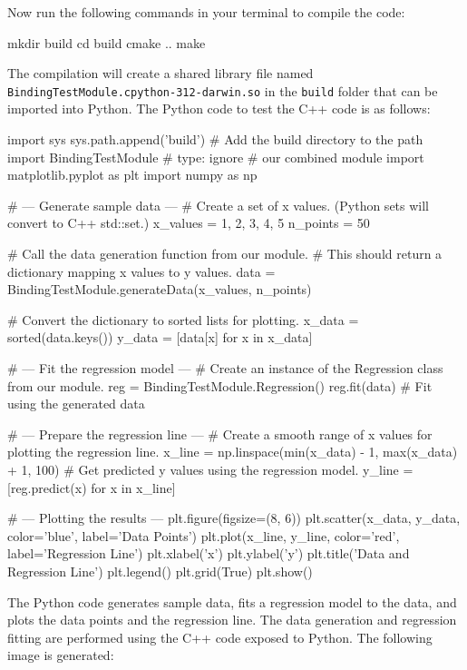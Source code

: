 Now run the following commands in your terminal to compile the code:

\begin{codeblock}[language=bash]
mkdir build
cd build
cmake ..
make
\end{codeblock}

The compilation will create a shared library file named \texttt{BindingTestModule.cpython-312-darwin.so} in the \texttt{build} folder that can be imported into Python. 
The Python code to test the C++ code is as follows:

\begin{exampleblock}[regression.py]
\begin{codeblock}[language=python]
import sys 
sys.path.append('build')  # Add the build directory to the path
import BindingTestModule  # type: ignore # our combined module
import matplotlib.pyplot as plt
import numpy as np

# --- Generate sample data ---
# Create a set of x values. (Python sets will convert to C++ std::set.)
x_values = {1, 2, 3, 4, 5}
n_points = 50

# Call the data generation function from our module.
# This should return a dictionary mapping x values to y values.
data = BindingTestModule.generateData(x_values, n_points)

# Convert the dictionary to sorted lists for plotting.
x_data = sorted(data.keys())
y_data = [data[x] for x in x_data]

# --- Fit the regression model ---
# Create an instance of the Regression class from our module.
reg = BindingTestModule.Regression()
reg.fit(data)  # Fit using the generated data

# --- Prepare the regression line ---
# Create a smooth range of x values for plotting the regression line.
x_line = np.linspace(min(x_data) - 1, max(x_data) + 1, 100)
# Get predicted y values using the regression model.
y_line = [reg.predict(x) for x in x_line]

# --- Plotting the results ---
plt.figure(figsize=(8, 6))
plt.scatter(x_data, y_data, color='blue', label='Data Points')
plt.plot(x_line, y_line, color='red', label='Regression Line')
plt.xlabel('x')
plt.ylabel('y')
plt.title('Data and Regression Line')
plt.legend()
plt.grid(True)
plt.show()
\end{codeblock}
\end{exampleblock}

The Python code generates sample data, fits a regression model to the data, and plots the data points and the regression line. The data generation and regression fitting are performed using the C++ code exposed to Python.
The following image is generated:

